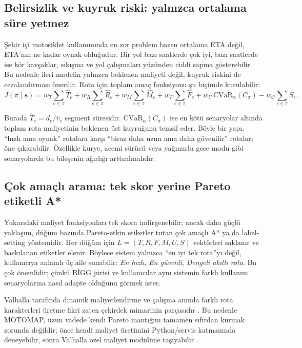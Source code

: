 \documentclass[11pt,a4paper]{article}
\begin{document}
\subsection{Belirsizlik ve kuyruk riski: yalnızca ortalama süre yetmez}

Şehir içi motosiklet kullanımında en zor problem bazen ortalama ETA değil, ETA'nın ne kadar oynak olduğudur. Bir yol bazı saatlerde çok iyi, bazı saatlerde ise kör kavşaklar, sıkışma ve yol çalışmaları yüzünden ciddi sapma gösterebilir. Bu nedenle ileri modelin yalnızca beklenen maliyeti değil, kuyruk riskini de cezalandırması önerilir. Rota için toplam amaç fonksiyonu şu biçimde kurulabilir:
\[
J(\pi\mid \mathbf{s}) = w_T\sum_{e\in\pi}\hat T_e + w_R\sum_{e\in\pi}\hat R_e + w_M\sum_{e\in\pi}\hat M_e + w_F\sum_{e\in\pi}\hat F_e + w_U\,\mathrm{CVaR}_{\alpha}(C_\pi) - w_C\sum_{e\in\pi}\hat S_e.
\]

Burada $\hat T_e = d_e/\hat v_e$ segment süresidir. $\mathrm{CVaR}_{\alpha}(C_\pi)$ ise en kötü senaryolar altında toplam rota maliyetinin beklenen üst kuyruğunu temsil eder. Böyle bir yapı, ``hızlı ama oynak'' rotalara karşı ``biraz daha uzun ama daha güvenilir'' rotaları öne çıkarabilir. Özellikle kurye, acemi sürücü veya yağmurlu gece modu gibi senaryolarda bu bileşenin ağırlığı arttırılmalıdır.

\subsection{Çok amaçlı arama: tek skor yerine Pareto etiketli A*}

Yukarıdaki maliyet fonksiyonları tek skora indirgenebilir; ancak daha güçlü yaklaşım, düğüm bazında Pareto-etkin etiketler tutan çok amaçlı A* ya da label-setting yöntemidir. Her düğüm için $L=(T,R,F,M,U,S)$ vektörleri saklanır ve baskılanan etiketler elenir. Böylece sistem yalnızca ``en iyi tek rota''yı değil, kullanıcıya anlamlı üç aile sunabilir: \emph{En hızlı}, \emph{En güvenli}, \emph{Dengeli akıllı rota}. Bu çok önemlidir; çünkü BİGG jürisi ve kullanıcılar aynı sistemin farklı kullanım senaryolarına nasıl adapte olduğunu görmek ister.

Valhalla tarafında dinamik maliyetlendirme ve çalışma anında farklı rota karakterleri üretme fikri zaten çekirdek mimarinin parçasıdır \cite{o8,o9}. Bu nedenle MOTOMAP, uzun vadede kendi Pareto mantığını tamamen sıfırdan kurmak zorunda değildir; önce kendi maliyet üretimini Python/servis katmanında deneyebilir, sonra Valhalla özel maliyet modülüne taşıyabilir \cite{g6}.
\end{document}
